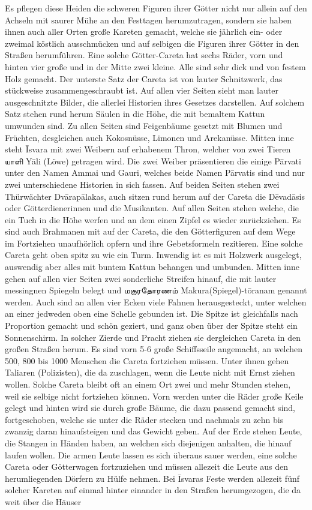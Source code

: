\documentclass{article}
\newcommand{\TamilText}[1]{\texttamil{#1}}
\newcommand{\tam}[1]{\TamilText{#1}}
\begin{document}
Es pflegen diese Heiden die schweren Figuren ihrer Götter nicht nur allein auf den Achseln mit saurer Mühe an den Festtagen herumzutragen, sondern sie haben ihnen auch aller Orten große Kareten gemacht, welche sie jährlich ein- oder zweimal köstlich ausschmücken und auf selbigen die Figuren ihrer Götter in den Straßen herumführen. Eine solche Götter-Careta hat sechs Räder, vorn und hinten vier große und in der Mitte zwei kleine. Alle sind sehr dick und von festem Holz gemacht. Der unterste Satz der Careta ist von lauter Schnitzwerk, das stückweise zusammengeschraubt ist. Auf allen vier Seiten sieht man lauter ausgeschnitzte Bilder, die allerlei Historien ihres Gesetzes darstellen. Auf solchem Satz stehen rund herum Säulen in die Höhe, die mit bemaltem Kattun umwunden sind. Zu allen Seiten sind Feigenbäume gesetzt mit Blumen und Früchten, desgleichen auch Kokosnüsse, Limonen und Arekanüsse. Mitten inne steht \={I}svara mit zwei Weibern auf erhabenem Thron, welcher von zwei Tieren \tam{யாளி} Y\={a}li (Löwe) getragen wird. Die zwei Weiber präsentieren die einige P\={a}rvati unter den Namen Ammai und Gauri, welches beide Namen P\={a}rvatis sind und nur zwei unterschiedene Historien in sich fassen. Auf beiden Seiten stehen zwei Thürwächter Dv\={a}rap\={a}lakas, auch sitzen rund herum auf der Careta die D\={e}vad\={a}sis oder Götterdienerinnen und die Musikanten. Auf allen Seiten stehen welche, die ein Tuch in die Höhe werfen und an dem einen Zipfel es wieder zurückziehen. Es sind auch Brahmanen mit auf der Careta, die den Götterfiguren auf dem Wege im Fortziehen unaufhörlich opfern und ihre Gebetsformeln rezitieren. Eine solche Careta geht oben spitz zu wie ein Turm. Inwendig ist es mit Holzwerk ausgelegt, auswendig aber alles mit buntem Kattun behangen und umbunden. Mitten inne gehen auf allen vier Seiten zwei sonderliche Streifen hinauf, die mit lauter messingnen Spiegeln belegt und \tam{மகுரதோரணம்} Makura(Spiegel)-t\={o}ranam genannt werden. Auch sind an allen vier Ecken viele Fahnen herausgesteckt, unter welchen an einer jedweden oben eine Schelle gebunden ist. Die Spitze ist gleichfalls nach Proportion gemacht und schön geziert, und ganz oben über der Spitze steht ein Sonnenschirm. In solcher Zierde und Pracht ziehen sie dergleichen Careta in den großen Straßen herum. Es sind vorn 5-6 große Schiffsseile angemacht, an welchen 500, 800 bis 1000 Menschen die Careta fortziehen müssen. Unter ihnen gehen Taliaren (Polizisten), die da zuschlagen, wenn die Leute nicht mit Ernst ziehen wollen. Solche Careta bleibt oft an einem Ort zwei und mehr Stunden stehen, weil sie selbige nicht fortziehen können. Vorn werden unter die Räder große Keile gelegt und hinten wird sie durch große Bäume, die dazu passend gemacht sind, fortgeschoben, welche sie unter die Räder stecken und nachmals zu zehn bis zwanzig daran hinaufsteigen und das Gewicht geben. Auf der Erde stehen Leute, die Stangen in Händen haben, an welchen sich diejenigen anhalten, die hinauf laufen wollen. Die armen Leute lassen es sich überaus sauer werden, eine solche Careta oder Götterwagen fortzuziehen und müssen allezeit die Leute aus den herumliegenden Dörfern zu Hülfe nehmen. Bei \={I}svaras Feste werden allezeit fünf solcher Kareten auf einmal hinter einander in den Straßen herumgezogen, die da weit über die Häuser 
\end{document}
